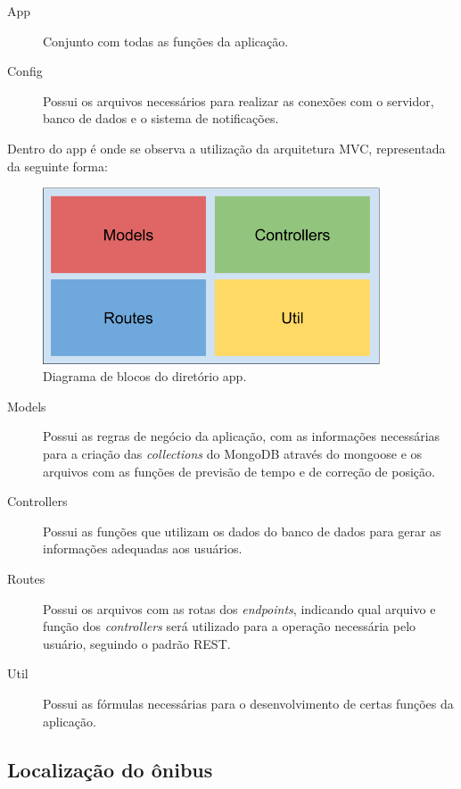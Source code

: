 \documentclass[
	12pt,				%
	oneside,			%
	a4paper,			%
	brazil				%
]{abntex2}
\begin{document}
{\begin{description}
\item[App] Conjunto com todas as funções da aplicação.
\item[Config] Possui os arquivos necessários para realizar as conexões com o servidor, banco de dados e o sistema de notificações.
\end{description}

Dentro do app é onde se observa a utilização da arquitetura MVC, representada da seguinte forma:

\begin{figure}[h]
\centering
\includegraphics[width=10cm, center]{images/brick_diagram_node_app}
\caption{Diagrama de blocos do diretório app.}
\label{Rotulo}
\end{figure}

\begin{description}
\item[Models] Possui as regras de negócio da aplicação, com as informações necessárias para a criação das \textit{collections} do MongoDB através do mongoose e os arquivos com as funções de previsão de tempo e de correção de posição.
\item[Controllers] Possui as funções que utilizam os dados do banco de dados para gerar as informações adequadas aos usuários.
\item[Routes] Possui os arquivos com as rotas dos \textit{endpoints}, indicando qual arquivo e função dos \textit{controllers} será utilizado para a operação necessária pelo usuário, seguindo o padrão REST.
\item[Util] Possui as fórmulas necessárias para o desenvolvimento de certas funções da aplicação. 
\end{description}

\subsection{Localização do ônibus}

}
\end{document}
